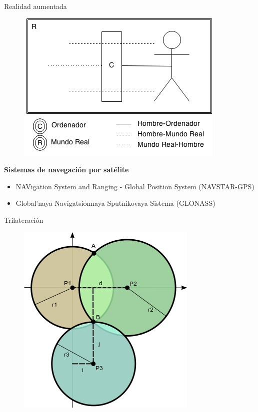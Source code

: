 \begin{slide}
  Realidad aumentada
  \begin{figure}[!h]
    \begin{center}
      \includegraphics[height=0.6\textheight]{img/RA.png}
    \end{center}
  \end{figure}
\end{slide}

\begin{slide}
  \begin{block}{\textbf{Sistemas de navegación por satélite}}
    \begin{itemize}
      \item NAVigation System and Ranging - Global Position System (NAVSTAR-GPS)
      \item Global’naya Navigatsionnaya Sputnikovaya Sistema (GLONASS)
    \end{itemize}
  \end{block}
\end{slide}

\begin{slide}
  Trilateración
  \begin{figure}[!h]
    \begin{center}
      \includegraphics[height=0.7\textheight]{img/trilateracion.png}
    \end{center}
  \end{figure}
\end{slide}


